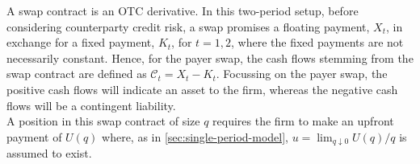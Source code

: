 \documentclass[main.tex]{subfiles}
\begin{document}
        A swap contract is an OTC derivative.
        In this two-period setup, before considering counterparty credit risk, a swap promises a floating payment, $X_t$, in exchange for a fixed payment, $K_t$, for $t = 1,2$, where the fixed payments are not necessarily constant.
        Hence, for the payer swap, the cash flows stemming from the swap contract are defined as $\mathcal{C}_t = X_t - K_t$.
        Focussing on the payer swap, the positive cash flows will indicate an asset to the firm, whereas the negative cash flows will be a contingent liability.
        \\
        A position in this swap contract of size $q$ requires the firm to make an upfront payment of $U(q)$ where, as in \cref{sec:single-period-model}, $u = \lim_{q \downarrow 0} U(q)/q$ is assumed to exist.
\end{document}
